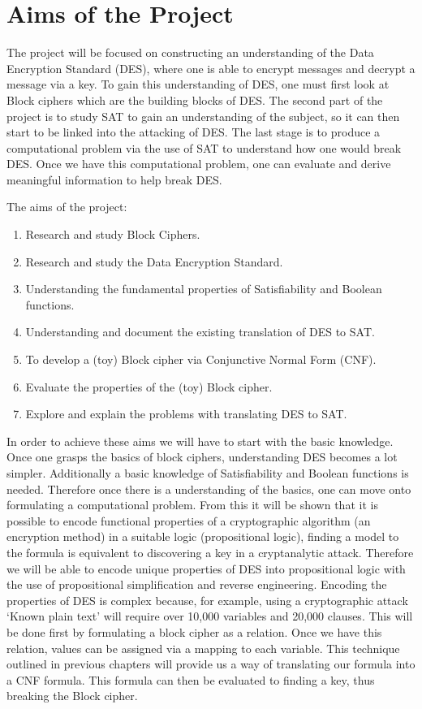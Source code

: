 \documentclass[11pt,a4paper, notitlepage]{report}
\begin{document}
\section{Aims of the Project}
\label{cha:Aims}

The project will be focused on constructing an understanding of the Data Encryption Standard (DES), where one is able to encrypt messages and decrypt a message via a key. To gain this understanding of DES, one must first look at Block ciphers which are the building blocks of DES. The second part of the project is to study SAT to gain an understanding of the subject, so it can then start to be linked into the attacking of DES. The last stage is to produce a computational problem via the use of SAT to understand how one would break DES. Once we have this computational problem, one can evaluate and derive meaningful information to help break DES. 

The aims of the project:

\begin{enumerate}
\item Research and study Block Ciphers.
\item Research and study the Data Encryption Standard.
\item Understanding the fundamental properties of Satisfiability and Boolean functions.
\item Understanding and document the existing translation of DES to SAT.
\item To develop a (toy) Block cipher via Conjunctive Normal Form (CNF).
\item Evaluate the properties of the (toy) Block cipher.
\item Explore and explain the problems with translating DES to SAT.
\end{enumerate}
In order to achieve these aims we will have to start with the basic knowledge. Once one grasps the basics of block ciphers, understanding DES becomes a lot simpler. Additionally a basic knowledge of Satisfiability and Boolean functions is needed. Therefore once there is a understanding of the basics, one can move onto formulating a computational problem. From this it will be shown that it is possible to encode functional properties of a cryptographic algorithm (an encryption method) in a suitable logic (propositional logic), finding a model to the formula is equivalent to discovering a key in a cryptanalytic attack. Therefore we will be able to encode unique properties of DES into propositional logic with the use of propositional simplification and reverse engineering. Encoding the properties of DES is complex because, for example, using a cryptographic attack `Known plain text' will require over 10,000 variables and 20,000 clauses. This will be done first by formulating a block cipher as a relation. Once we have this relation, values can be assigned via a mapping to each variable. This technique outlined in previous chapters will provide us a way of translating our formula into a CNF formula. This formula can then be evaluated to finding a key, thus breaking the Block cipher. 
\end{document}
